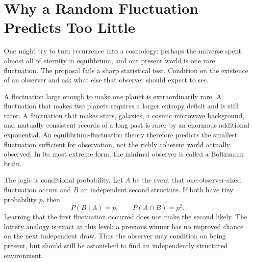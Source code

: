 \section{Why a Random Fluctuation Predicts Too Little}

One might try to turn recurrence into a cosmology: perhaps the universe spent
almost all of eternity in equilibrium, and our present world is one rare
fluctuation.  The proposal fails a sharp statistical test.  Condition on the
existence of an observer and ask what else that observer should expect to
see.

A fluctuation large enough to make one planet is extraordinarily rare.  A
fluctuation that makes two planets requires a larger entropy deficit and is
still rarer.  A fluctuation that makes stars, galaxies, a cosmic microwave
background, and mutually consistent records of a long past is rarer by an
enormous additional exponential.  An equilibrium-fluctuation theory
therefore predicts the smallest fluctuation sufficient for observation, not
the richly coherent world actually observed.  In its most extreme form, the
minimal observer is called a Boltzmann brain.

The logic is conditional probability.  Let \(A\) be the event that one
observer-sized fluctuation occurs and \(B\) an independent second structure.
If both have tiny probability \(p\), then
\begin{equation}
 P(B\mid A)=p,
 \qquad
 P(A\cap B)=p^2.
 \label{eq:sm8-conditional-fluctuations}
\end{equation}
Learning that the first fluctuation occurred does not make the second likely.
The lottery analogy is exact at this level: a previous winner has no improved
chance on the next independent draw.  Thus the observer may condition on
being present, but should still be astonished to find an independently
structured environment.

\begin{classroomqa}
\end{classroomqa}

